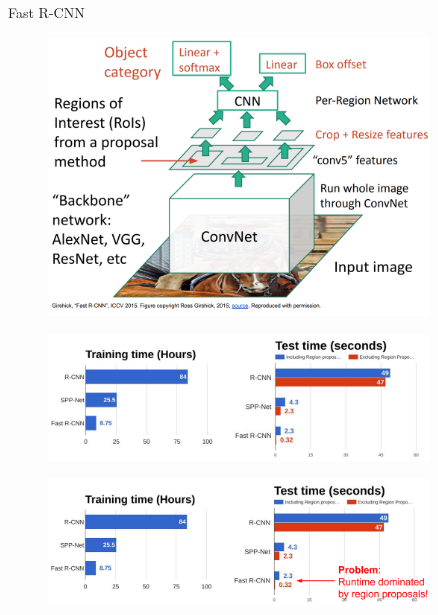 \begin{frame}[allowframebreaks]{Fast R-CNN}

\begin{figure}
\centering
\includegraphics[width=0.9\textwidth,height=0.9\textheight,keepaspectratio]{images/obj-det/fast_rcnn_1.png}
\end{figure}

\framebreak

\begin{figure}
\centering
\includegraphics[width=0.9\textwidth,height=0.9\textheight,keepaspectratio]{images/obj-det/fast_rcnn_2.png}
\end{figure}

\framebreak

\begin{figure}
\centering
\includegraphics[width=0.9\textwidth,height=0.9\textheight,keepaspectratio]{images/obj-det/fast_rcnn_3.png}
\end{figure}
    
\end{frame}